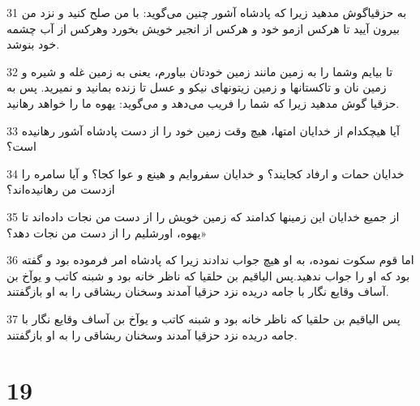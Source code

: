 \par 31 به حزقیاگوش مدهید زیرا که پادشاه آشور چنین می‌گوید: با من صلح کنید و نزد من بیرون آیید تا هرکس ازمو خود و هرکس از انجیر خویش بخورد وهرکس از آب چشمه خود بنوشد.
\par 32 تا بیایم وشما را به زمین مانند زمین خودتان بیاورم، یعنی به زمین غله و شیره و زمین نان و تاکستانها و زمین زیتونهای نیکو و عسل تا زنده بمانید و نمیرید. پس به حزقیا گوش مدهید زیرا که شما را فریب می‌دهد و می‌گوید: یهوه ما را خواهد رهانید.
\par 33 آیا هیچکدام از خدایان امتها، هیچ وقت زمین خود را از دست پادشاه آشور رهانیده است؟
\par 34 خدایان حمات و ارفاد کجایند؟ و خدایان سفروایم و هینع و عوا کجا؟ و آیا سامره را ازدست من رهانیده‌اند؟
\par 35 از جمیع خدایان این زمینها کدامند که زمین خویش را از دست من نجات داده‌اند تا یهوه، اورشلیم را از دست من نجات دهد؟»
\par 36 اما قوم سکوت نموده، به او هیچ جواب ندادند زیرا که پادشاه امر فرموده بود و گفته بود که او را جواب ندهید.پس الیاقیم بن حلقیا که ناظر خانه بود و شبنه کاتب و یوآخ بن آساف وقایع نگار با جامه دریده نزد حزقیا آمدند وسخنان ربشاقی را به او باز‌گفتند.
\par 37 پس الیاقیم بن حلقیا که ناظر خانه بود و شبنه کاتب و یوآخ بن آساف وقایع نگار با جامه دریده نزد حزقیا آمدند وسخنان ربشاقی را به او باز‌گفتند.
 
\chapter{19}

